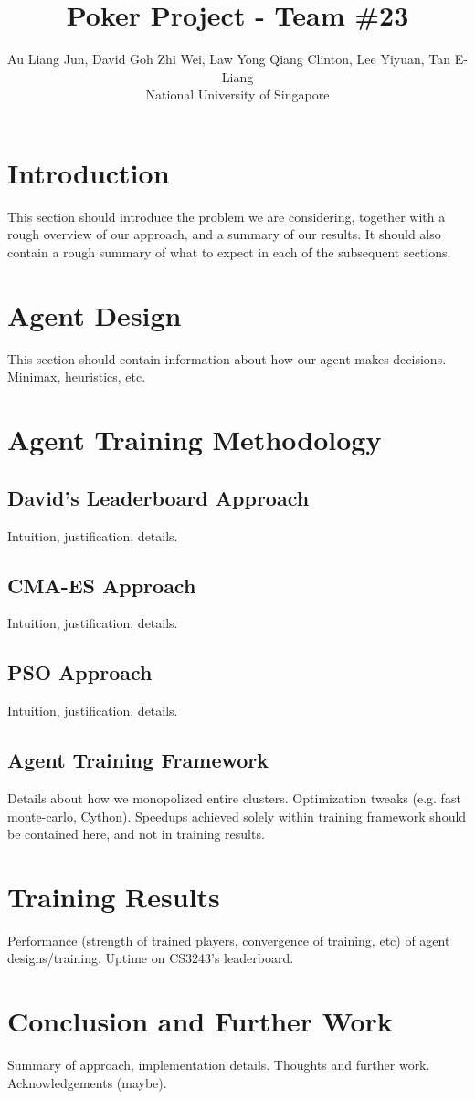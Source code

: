 \documentclass{article}
\title{Poker Project - Team \#23}
\author{
Au Liang Jun, David Goh Zhi Wei, Law Yong Qiang Clinton, Lee Yiyuan, Tan E-Liang
\\ 
National University of Singapore
}
\begin{document}
\maketitle

\section{Introduction}
This section should introduce the problem we are considering, together with a rough overview of our approach, and a summary of our results. It should also contain a rough summary of what to expect in each of the subsequent sections.

\section{Agent Design}
This section should contain information about how our agent makes decisions. Minimax, heuristics, etc.

\section{Agent Training Methodology}
\subsection{David's Leaderboard Approach}
Intuition, justification, details.

\subsection{CMA-ES Approach}
Intuition, justification, details.

\subsection{PSO Approach} 
Intuition, justification, details.

\subsection{Agent Training Framework}
Details about how we monopolized entire clusters. Optimization tweaks (e.g. fast monte-carlo, Cython). Speedups achieved solely within training framework should be contained here, and not in training results.

\section{Training Results}
Performance (strength of trained players, convergence of training, etc) of agent designs/training. Uptime on CS3243's leaderboard.

\section{Conclusion and Further Work}
Summary of approach, implementation details. Thoughts and further work. Acknowledgements (maybe).



\end{document}

